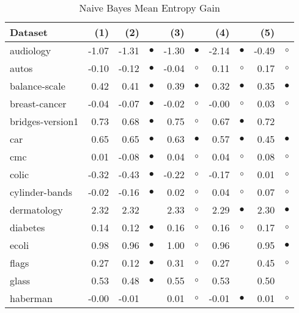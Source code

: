 \newpage
{\centering \footnotesize \begin{longtable}{lrr@{\hspace{0.1cm}}cr@{\hspace{0.1cm}}cr@{\hspace{0.1cm}}cr@{\hspace{0.1cm}}c}
\caption{\label{nbmeg}Naive Bayes Mean Entropy Gain}
\\
\hline
Dataset & (1)& (2) & & (3) & & (4) & & (5) & \\
\hline
audiology & -1.07 & -1.31 & $\bullet$ & -1.30 & $\bullet$ & -2.14 & $\bullet$ & -0.49 &    $\circ$\\
autos & -0.10 & -0.12 & $\bullet$ & -0.04 &   $\circ$ &  0.11 &   $\circ$ &  0.17 &    $\circ$\\
balance-scale &  0.42 &  0.41 & $\bullet$ &  0.39 & $\bullet$ &  0.32 & $\bullet$ &  0.35 &  $\bullet$\\
breast-cancer & -0.04 & -0.07 & $\bullet$ & -0.02 &   $\circ$ & -0.00 &   $\circ$ &  0.03 &    $\circ$\\
bridges-version1 &  0.73 &  0.68 & $\bullet$ &  0.75 &   $\circ$ &  0.67 & $\bullet$ &  0.72 &           \\
car &  0.65 &  0.65 & $\bullet$ &  0.63 & $\bullet$ &  0.57 & $\bullet$ &  0.45 &  $\bullet$\\
cmc &  0.01 & -0.08 & $\bullet$ &  0.04 &   $\circ$ &  0.04 &   $\circ$ &  0.08 &    $\circ$\\
colic & -0.32 & -0.43 & $\bullet$ & -0.22 &   $\circ$ & -0.17 &   $\circ$ &  0.01 &    $\circ$\\
cylinder-bands & -0.02 & -0.16 & $\bullet$ &  0.02 &   $\circ$ &  0.04 &   $\circ$ &  0.07 &    $\circ$\\
dermatology &  2.32 &  2.32 &           &  2.33 &   $\circ$ &  2.29 & $\bullet$ &  2.30 &  $\bullet$\\
diabetes &  0.14 &  0.12 & $\bullet$ &  0.16 &   $\circ$ &  0.16 &   $\circ$ &  0.17 &    $\circ$\\
ecoli &  0.98 &  0.96 & $\bullet$ &  1.00 &   $\circ$ &  0.96 &           &  0.95 &  $\bullet$\\
flags &  0.27 &  0.12 & $\bullet$ &  0.31 &   $\circ$ &  0.27 &           &  0.45 &    $\circ$\\
glass &  0.53 &  0.48 & $\bullet$ &  0.55 &   $\circ$ &  0.53 &           &  0.50 &           \\
haberman & -0.00 & -0.01 &           &  0.01 &   $\circ$ & -0.01 & $\bullet$ &  0.01 &    $\circ$\\

\end{longtable}}
